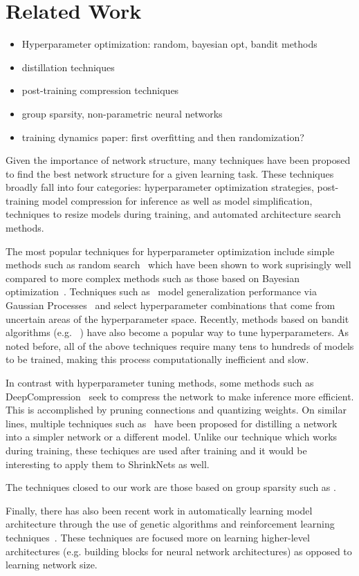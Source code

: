 \section{Related Work}

\begin{itemize}
  \item Hyperparameter optimization: random, bayesian opt, bandit methods
  \item distillation techniques
  \item post-training compression techniques
  \item group sparsity, non-parametric neural networks
  \item training dynamics paper: first overfitting and then randomization?
\end{itemize}

Given the importance of network structure, many techniques have been proposed to
find the best network structure for a given learning task.
These techniques broadly fall into four categories: hyperparameter optimization
strategies, post-training model compression for inference as well as model 
simplification, techniques to resize models during training, and 
automated architecture search methods.

The most popular techniques for hyperparameter optimization include simple 
methods such as random search~\cite{Bergstra2012} which have been shown to work
suprisingly well compared to more complex methods such as those based on
Bayesian optimization~\cite{Snoek12}.
Techniques such as~\cite{Snoek12} model generalization performance via 
Gaussian Processes~\cite{GaussianProcesses} and select hyperparameter 
combinations that come from uncertain areas of the hyperparameter space.
Recently, methods based on bandit algorithms (e.g. ~\cite{li2016hyperband, 
jamieson2016}) have also become a popular way to tune hyperparameters.
As noted before, all of the above techniques require many tens to hundreds of
models to be trained, making this process computationally inefficient and slow.

In contrast with hyperparameter tuning methods, some methods such as 
DeepCompression~\cite{han2015deepcompression} seek to compress the network to 
make inference more efficient.
This is accomplished by pruning connections and quantizing weights.
On similar lines, multiple techniques such as~\cite{romero2014fitnets, 
hinton2015distilling} have been proposed for distilling a network into a 
simpler network or a different model.
Unlike our technique which works during training, these techiques are used after
training and it would be interesting to apply them to ShrinkNets as well.

The techniques closed to our work are those based on group sparsity such as 
.

Finally, there has also been recent work in automatically learning model
architecture through the use of genetic algorithms and reinforcement learning 
techniques~\cite{DBLP:journals/corr/ZophL16, zoph2017learning}.
These techniques are focused more on learning higher-level architectures (e.g.
building blocks for neural network architectures) as opposed to learning 
network size.
